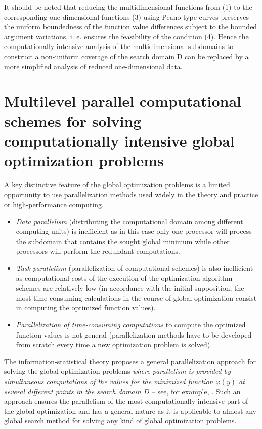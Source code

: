 \documentclass[
11pt,%
tightenlines,%
twoside,%
onecolumn,%
nofloats,%
nobibnotes,%
nofootinbib,%
superscriptaddress,%
noshowpacs,%
centertags]%
{revtex4}
\begin{document}
It should be noted that reducing the multidimensional functions from (1) to the corresponding one-dimensional functions (3) using Peano-type curves preserves the uniform boundedness of the function value differences subject to the bounded argument variations, i. e. ensures the feasibility of the condition (4). Hence the computationally intensive analysis of the multidimensional subdomains to construct a non-uniform coverage of the search domain D can be replaced by a more simplified analysis of reduced one-dimensional data.


\section{Multilevel parallel computational schemes for solving computationally intensive global optimization problems}

A key distinctive feature of the global optimization problems is a limited opportunity to use parallelization methods used widely in the theory and practice or high-performance computing.
\begin{itemize}
\item \textit{Data parallelism} (distributing the computational domain among different computing units) is inefficient as in this case only one processor will process the subdomain that contains the sought global minimum while other processors will perform the redundant computations.

\item \textit{Task parallelism} (parallelization of computational schemes) is also inefficient as computational costs of the execution of the optimization algorithm schemes are relatively low (in accordance with the initial supposition, the most time-consuming calculations in the course of global optimization consist in computing the optimized function values).

\item \textit{Parallelization of time-consuming computations} to compute the optimized function values is not general (parallelization methods have to be developed from scratch every time a new optimization problem is solved).
\end{itemize}

The information-statistical theory proposes a general parallelization approach for solving the global optimization problems \textit{where parallelism is provided by simultaneous computations of the values for the minimized function $\varphi(y)$ at several different points in the search domain $D$} -- see, for example, \cite{Strongin1, Strongin2, Strongin4}. Such an approach ensures the parallelism of the most computationally intensive part of the global optimization and has a general nature as it is applicable to almost any global search method for solving any kind of global optimization problems.
\end{document}

